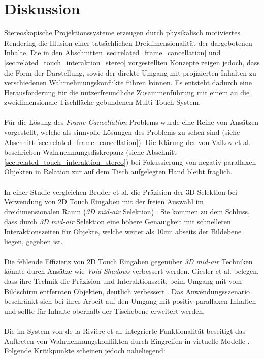 \section{Diskussion}
\label{sec:diskussion_wahrnehmungskonflikte}

Stereoskopische Projektionssysteme erzeugen durch physikalisch motiviertes Rendering die Illusion einer tatsächlichen Dreidimensionalität der dargebotenen Inhalte. Die in den Abschnitten \ref{sec:related_frame_cancellation} und \ref{sec:related_touch_interaktion_stereo} vorgestellten Konzepte zeigen jedoch, dass die Form der Darstellung, sowie der direkte Umgang mit projizierten Inhalten zu verschiedenen Wahrnehmungskonflikte führen können. Es entsteht dadurch eine Herausforderung für die nutzerfreundliche Zusammenführung mit einem an die zweidimensionale Tischfläche gebundenen Multi-Touch System. 
\\\\
Für die Lösung des \emph{Frame Cancellation} Problems wurde eine Reihe von Ansätzen vorgestellt, welche als sinnvolle Lösungen des Problems zu sehen sind (siehe Abschnitt \ref{sec:related_frame_cancellation}). Die Klärung der von Valkov et al. beschrieben Wahrnehmungsdiskrepanz (siehe Abschnitt \ref{sec:related_touch_interaktion_stereo}) bei Fokussierung von negativ-parallaxen Objekten in Relation zur auf dem Tisch aufgelegten Hand bleibt fraglich.
\\\\
In einer Studie vergleichen Bruder et al. die Präzision der 3D Selektion bei Verwendung von 2D Touch Eingaben mit der freien Auswahl im dreidimensionalen Raum (\emph{3D mid-air} Selektion) \cite{bruder:2013}. Sie kommen zu dem Schluss, dass durch \emph{3D mid-air} Selektion eine höhere Genauigkeit mit schnelleren Interaktionszeiten für Objekte, welche weiter als 10cm abseits der Bildebene liegen, gegeben ist.
\\\\
Die fehlende Effizienz von 2D Touch Eingaben gegenüber \emph{3D mid-air} Techniken könnte durch Ansätze wie \emph{Void Shadows} verbessert werden. Giesler et al. belegen, dass ihre Technik die Präzision und Interaktionszeit, beim Umgang mit vom Bildschirm entfernten Objekten, deutlich verbessert \linebreak \cite{giesler:2014}. Das Anwendungsszenario beschränkt sich bei ihrer Arbeit auf den Umgang mit positiv-parallaxen Inhalten und sollte für Inhalte oberhalb der Tischebene erweitert werden.
\\\\
Die im System von de la Rivière et al. integrierte Funktionalität beseitigt das Auftreten von Wahrnehmungskonflikten durch Eingreifen in virtuelle Modelle \cite{delariviere:2010}. Folgende Kritikpunkte scheinen jedoch naheliegend:


